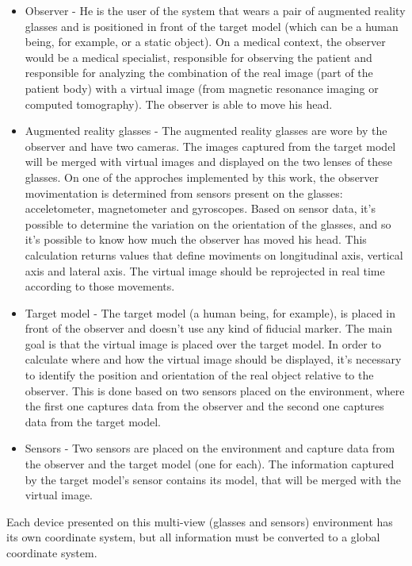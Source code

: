 \documentclass[msc, a4paper, classic, en]{ufbathesis}
\begin{document}
\begin{itemize}
  \item Observer - He is the user of the system that wears a pair of augmented reality glasses and is positioned in front of the target model (which can be a human being, for example, or a static object). On a medical context, the observer would be a medical specialist, responsible for observing the patient and responsible for analyzing the combination of the real image (part of the patient body) with a virtual image (from magnetic resonance imaging or computed tomography). The observer is able to move his head.
  \item Augmented reality glasses - The augmented reality glasses are wore by the observer and have two cameras. The images captured from the target model will be merged with virtual images and displayed on the two lenses of these glasses. On one of the approches implemented by this work, the observer movimentation is determined from sensors present on the glasses: acceletometer, magnetometer and gyroscopes. Based on sensor data, it's possible to determine the variation on the orientation of the glasses, and so it's possible to know how much the observer has moved his head. This calculation returns values that define moviments on longitudinal axis, vertical axis and lateral axis. The virtual image should be reprojected in real time according to those movements.
  \item Target model - The target model (a human being, for example), is placed in front of the observer and doesn't use any kind of fiducial marker. The main goal is that the virtual image is placed over the target model. In order to calculate where and how the virtual image should be displayed, it's necessary to identify the position and orientation of the real object relative to the observer. This is done based on two sensors placed on the environment, where the first one captures data from the observer and the second one captures data from the target model.
  \item Sensors - Two sensors are placed on the environment and capture data from the observer and the target model (one for each). The information captured by the target model's sensor contains its model, that will be merged with the virtual image.
\end{itemize}

Each device presented on this multi-view (glasses and sensors) environment has its own coordinate system, but all information must be converted to a global coordinate system.
\end{document}
